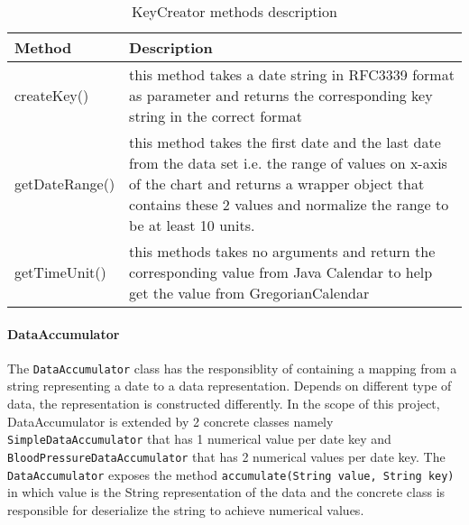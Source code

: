 
\begin{table}[h]
\begin{center}
    \begin{tabular}{| l | p{12cm} |}
        \hline Method & Description \\
        \hline createKey() & 
            this method takes a date string in RFC3339 format as parameter and returns the corresponding key string in
            the correct format \\
        \hline getDateRange() &
            this method takes the first date and the last date from the data set i.e. the range of values on x-axis of
            the chart and returns a wrapper object that contains these 2 values and normalize the range to be at least
            10 units. \\
        \hline getTimeUnit() &
            this methods takes no arguments and return the corresponding value from Java Calendar to help get the value
            from GregorianCalendar \\
        \hline
    \end{tabular}
    \caption{KeyCreator methods description}
\end{center}
\end{table}

\paragraph{DataAccumulator}
The \texttt{DataAccumulator} class has the responsiblity of containing a mapping from a string representing a date to a
data representation. Depends on different type of data, the representation is constructed differently. In the scope of
this project, DataAccumulator is extended by 2 concrete classes namely \texttt{SimpleDataAccumulator} that has 1
numerical value per date key and \texttt{BloodPressureDataAccumulator} that has 2 numerical values per date key. The
\texttt{DataAccumulator} exposes the method \texttt{accumulate(String value, String key)} in which value is the String
representation of the data and the concrete class is responsible for deserialize the string to achieve numerical values.

